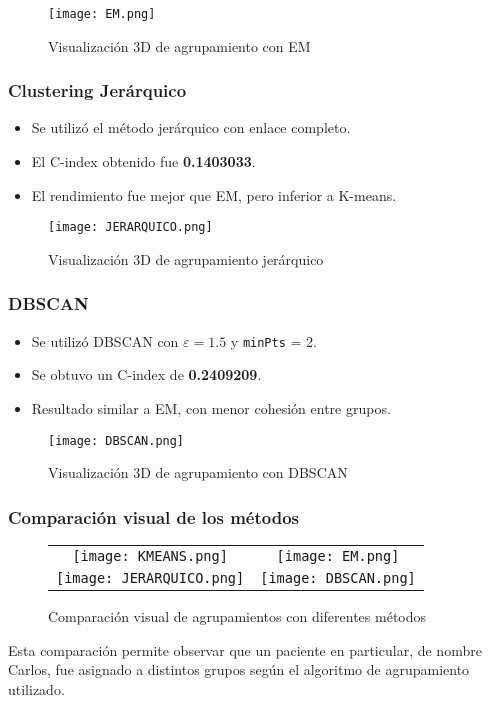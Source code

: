 \documentclass[12pt]{report}
\begin{document}
\begin{figure}[H]
    \centering
    \texttt{[image: EM.png]}
    \caption{Visualización 3D de agrupamiento con EM}
\end{figure}
\newpage
\subsubsection{Clustering Jerárquico}
\begin{itemize}
    \item Se utilizó el método jerárquico con enlace completo.
    \item El C-index obtenido fue \textbf{0.1403033}.
    \item El rendimiento fue mejor que EM, pero inferior a K-means.
\end{itemize}

\begin{figure}[H]
    \centering
    \texttt{[image: JERARQUICO.png]}
    \caption{Visualización 3D de agrupamiento jerárquico}
\end{figure}
\newpage
\subsubsection{DBSCAN}
\begin{itemize}
    \item Se utilizó DBSCAN con $\varepsilon = 1.5$ y \texttt{minPts} = 2.
    \item Se obtuvo un C-index de \textbf{0.2409209}.
    \item Resultado similar a EM, con menor cohesión entre grupos.
\end{itemize}

\begin{figure}[H]
    \centering
    \texttt{[image: DBSCAN.png]}
    \caption{Visualización 3D de agrupamiento con DBSCAN}
\end{figure}
\newpage
\subsubsection{Comparación visual de los métodos}
\begin{figure}[H]
    \centering
    \begin{tabular}{cc}
        \texttt{[image: KMEANS.png]} & 
        \texttt{[image: EM.png]} \\
        \texttt{[image: JERARQUICO.png]} & 
        \texttt{[image: DBSCAN.png]} \\
    \end{tabular}
    \caption{Comparación visual de agrupamientos con diferentes métodos}
\end{figure}
Esta comparación permite observar que un paciente en particular, de nombre Carlos, fue asignado a distintos grupos según el algoritmo de agrupamiento utilizado. 
\end{document}
